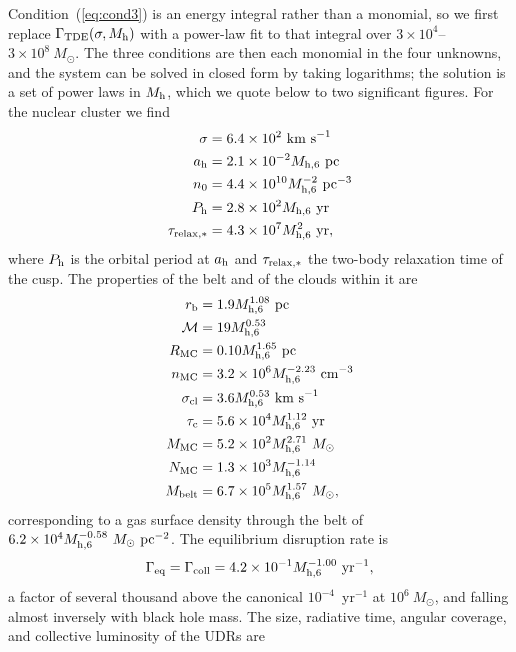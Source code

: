 \documentclass[preprint2]{aastex}
\newcommand{\msun}{M_{\odot}\xspace}
\newcommand{\mhsix}{M_{\rm h,6}\xspace}
\begin{document}
Condition~(\ref{eq:cond3}) is an energy integral rather than a monomial, so we first replace $\Gamma_{\rm TDE}(\sigma, M_{\rm h})$ with a power-law fit to that integral over $3 \times 10^{4}$--$3 \times 10^{8}~\msun$. The three conditions are then each monomial in the four unknowns, and the system can be solved in closed form by taking logarithms; the solution is a set of power laws in $M_{\rm h}$, which we quote below to two significant figures. For the nuclear cluster we find
\begin{align}
\sigma &= 6.4 \times 10^{2}~{\rm km~s}^{-1}\\
a_{\rm h} &= 2.1 \times 10^{-2} \mhsix~{\rm pc}\\
n_{0} &= 4.4 \times 10^{10} \mhsix^{-2}~{\rm pc}^{-3}\\
P_{\rm h} &= 2.8 \times 10^{2} \mhsix~{\rm yr}\\
\tau_{\rm relax,\ast} &= 4.3 \times 10^{7} \mhsix^{2}~{\rm yr},
\end{align}
where $P_{\rm h}$ is the orbital period at $a_{\rm h}$ and $\tau_{\rm relax,\ast}$ the two-body relaxation time of the cusp. The properties of the belt and of the clouds within it are
\begin{align}
r_{\rm b} &= 1.9 \mhsix^{1.08}~{\rm pc}\\
{\cal M} &= 19 \mhsix^{0.53}\\
R_{\rm MC} &= 0.10 \mhsix^{1.65}~{\rm pc}\\
n_{\rm MC} &= 3.2 \times 10^{6} \mhsix^{-2.23}~{\rm cm}^{-3}\\
\sigma_{\rm cl} &= 3.6 \mhsix^{0.53}~{\rm km~s}^{-1}\\
\tau_{\rm c} &= 5.6 \times 10^{4} \mhsix^{1.12}~{\rm yr}\\
M_{\rm MC} &= 5.2 \times 10^{2} \mhsix^{2.71}~\msun\\
N_{\rm MC} &= 1.3 \times 10^{3} \mhsix^{-1.14}\\
M_{\rm belt} &= 6.7 \times 10^{5} \mhsix^{1.57}~\msun,
\end{align}
corresponding to a gas surface density through the belt of $6.2 \times 10^{4} \mhsix^{-0.58}~\msun~{\rm pc}^{-2}$. The equilibrium disruption rate is
\begin{equation}
\Gamma_{\rm eq} = \Gamma_{\rm coll} = 4.2 \times 10^{-1} \mhsix^{-1.00}~{\rm yr}^{-1},\label{eq:eqrate}
\end{equation}
a factor of several thousand above the canonical $10^{-4}$~yr$^{-1}$ at $10^{6}~\msun$, and falling almost inversely with black hole mass. The size, radiative time, angular coverage, and collective luminosity of the UDRs are
\end{document}
